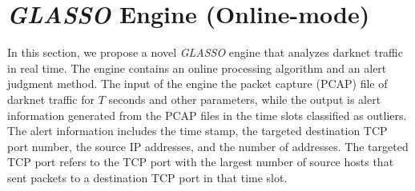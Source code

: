 \documentclass[conference]{IEEEtran}
\begin{document}



\section{{\it GLASSO} Engine (Online-mode)}
In this section, we propose a novel {\it GLASSO} engine that analyzes darknet traffic in real time.
The engine contains an online processing algorithm and an alert judgment method.
The input of the engine the packet capture (PCAP) file of darknet traffic for $T$ seconds and other parameters, while the output is alert information generated from the PCAP files in the time slots classified as outliers.
The alert information includes the time stamp, the targeted destination TCP port number, the source IP addresses, and the number of addresses.
The targeted TCP port refers to the TCP port with the largest number of source hosts that sent packets to a destination TCP port in that time slot.


\end{document}
